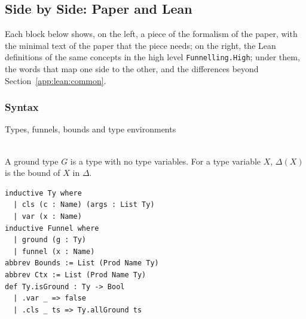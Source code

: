 \subsection{Side by Side: Paper and Lean}
\label{app:lean:sidebyside}
Each block below shows, on the left, a piece of the formalism of the paper, with the minimal text of the paper that the piece needs; on the right, the Lean definitions of the same concepts in the high level \texttt{Funnelling.High}; under them, the words that map one side to the other, and the differences beyond Section~\ref{app:lean:common}.

\subsubsection{Syntax}

\begin{cmp}{Types, funnels, bounds and type environments}
\begin{paperside}
\\[1ex]
A ground type $G$ is a type with no type variables.
For a type variable $X$, $\Delta(X)$ is the bound of $X$ in $\Delta$.
\end{paperside}
\begin{leanside}
\begin{lstlisting}[style=leanside]
inductive Ty where
  | cls (c : Name) (args : List Ty)
  | var (x : Name)
inductive Funnel where
  | ground (g : Ty)
  | funnel (x : Name)
abbrev Bounds := List (Prod Name Ty)
abbrev Ctx := List (Prod Name Ty)
def Ty.isGround : Ty -> Bool
  | .var _ => false
  | .cls _ ts => Ty.allGround ts
\end{lstlisting}
\end{leanside}
\end{cmp}

